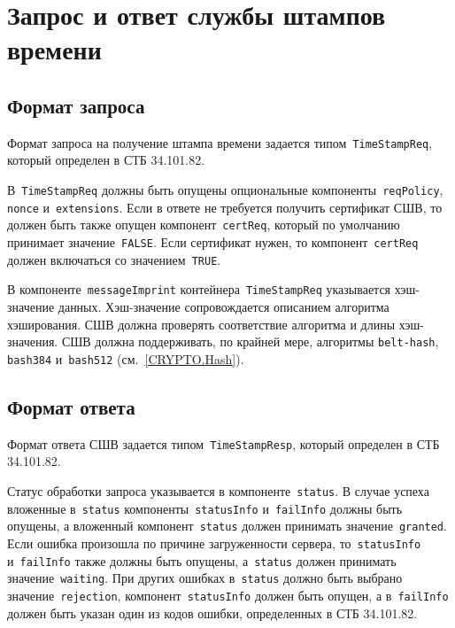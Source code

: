 \section{Запрос и ответ службы штампов времени}\label{FMT.TSP}

\subsection{Формат запроса}\label{FMT.TSP.Req}

Формат запроса на получение штампа времени задается 
типом~\texttt{TimeStampReq}, который определен в СТБ 34.101.82. 

В~\texttt{TimeStampReq} должны быть опущены опциональные 
компоненты~\texttt{reqPolicy}, \texttt{nonce} и~\texttt{extensions}. 
%
Если в ответе не требуется получить сертификат СШВ, 
то должен быть также опущен компонент~\texttt{certReq},
который по умолчанию принимает значение~\texttt{FALSE}.
%
Если сертификат нужен, то компонент~\texttt{certReq}
должен включаться со значением~\texttt{TRUE}.

В компоненте~\texttt{messageImprint} контейнера~\texttt{TimeStampReq}
указывается хэш-значение данных. 
Хэш-значение сопровождается описанием алгоритма хэширования.
СШВ должна проверять соответствие алгоритма и длины хэш-значения.
СШВ должна поддерживать, по крайней мере, алгоритмы \texttt{belt-hash},
\texttt{bash384} и~\texttt{bash512} (см.~\ref{CRYPTO.Hash}).

\subsection{Формат ответа}\label{FMT.TSP.Resp}
 
Формат ответа СШВ задается типом~\texttt{TimeStampResp}, который определен 
в СТБ 34.101.82. 

Статус обработки запроса указывается в компоненте~\texttt{status}.
%
В случае успеха вложенные в~\texttt{status} компоненты~\texttt{statusInfo} 
и~\texttt{failInfo} должны быть опущены, а вложенный
компонент~\texttt{status} должен принимать значение~\texttt{granted}.
%
Если ошибка произошла по причине загруженности сервера, 
то~\texttt{statusInfo} и~\texttt{failInfo} также должны быть опущены, 
а~\texttt{status} должен принимать значение~\texttt{waiting}.
%
При других ошибках в~\texttt{status} должно быть выбрано 
значение~\texttt{rejection}, компонент~\texttt{statusInfo}
должен быть опущен, а в~\texttt{failInfo} должен быть указан один из 
кодов ошибки, определенных в СТБ 34.101.82.

